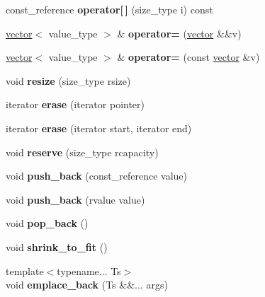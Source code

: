 \begin{DoxyCompactItemize}
\item 
\mbox{\label{classvector_ad94741b9920b6d82c59ec8740c0be61c}} 
const\+\_\+reference {\bfseries operator\mbox{[}$\,$\mbox{]}} (size\+\_\+type i) const
\item 
\mbox{\label{classvector_ab81550edd42b8f915b39fed03b76d912}} 
\mbox{\hyperlink{classvector}{vector}}$<$ value\+\_\+type $>$ \& {\bfseries operator=} (\mbox{\hyperlink{classvector}{vector}} \&\&v)
\item 
\mbox{\label{classvector_ae11fd900857756770c927745f4a94d4b}} 
\mbox{\hyperlink{classvector}{vector}}$<$ value\+\_\+type $>$ \& {\bfseries operator=} (const \mbox{\hyperlink{classvector}{vector}} \&v)
\item 
\mbox{\label{classvector_a67d18c6fcc4c1ba14171f605b6015bb7}} 
void {\bfseries resize} (size\+\_\+type rsize)
\item 
\mbox{\label{classvector_a671ee58af771ce94bb9075420d818f62}} 
iterator {\bfseries erase} (iterator pointer)
\item 
\mbox{\label{classvector_ad6889164758ba7161a086ab5f745bf1a}} 
iterator {\bfseries erase} (iterator start, iterator end)
\item 
\mbox{\label{classvector_ac169ba0510ad3d5dad3c915d104c8dda}} 
void {\bfseries reserve} (size\+\_\+type rcapacity)
\item 
\mbox{\label{classvector_a0bd81ea30167301e06430e8d4b97a9b8}} 
void {\bfseries push\+\_\+back} (const\+\_\+reference value)
\item 
\mbox{\label{classvector_a09a4f41db3b3f70b08174303fd83b8fd}} 
void {\bfseries push\+\_\+back} (rvalue value)
\item 
\mbox{\label{classvector_aeec9e5d602d555d466a936310aa47866}} 
void {\bfseries pop\+\_\+back} ()
\item 
\mbox{\label{classvector_ac021d1a35685a22b0f980693f227b715}} 
void {\bfseries shrink\+\_\+to\+\_\+fit} ()
\item 
\mbox{\label{classvector_a65bb8b85b4171efbd63cf37504ce8059}} 
{\footnotesize template$<$typename... Ts$>$ }\\void {\bfseries emplace\+\_\+back} (Ts \&\&... args)
\end{DoxyCompactItemize}
